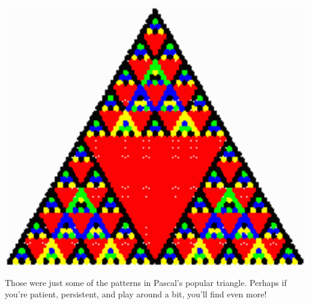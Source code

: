 \documentclass{article}
\begin{document}
\begin{center}
	\includegraphics[scale=0.35]{images/pascal5.png}
\end{center}


Those were just some of the patterns in Pascal's popular triangle. Perhaps if you're patient, persistent, and play around a bit, you'll find even more!
\end{document}
